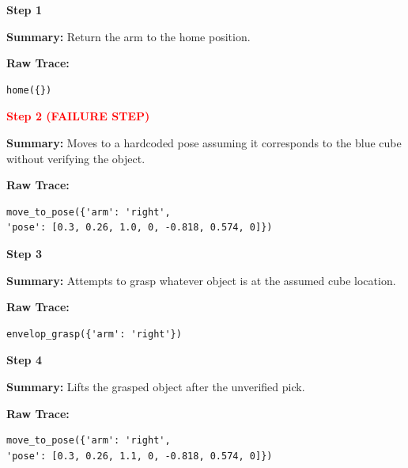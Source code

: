 \documentclass[11pt]{article}
\begin{document}


\begin{tcolorbox}[
breakable,
colback=customwhite,
colframe=customgreen,
title=False Assumption,
fontupper=\fontfamily{pcr}\selectfont\scriptsize
]

\textbf{Step 1}

\textbf{Summary:}  
Return the arm to the home position.

\textbf{Raw Trace:}
\begin{verbatim}
home({})
\end{verbatim}

\medskip
\textbf{\textcolor{red}{Step 2 (FAILURE STEP)}}

\textbf{Summary:}  
Moves to a hardcoded pose assuming it corresponds to the blue cube without verifying the object.

\textbf{Raw Trace:}
\begin{verbatim}
move_to_pose({'arm': 'right',
'pose': [0.3, 0.26, 1.0, 0, -0.818, 0.574, 0]})
\end{verbatim}

\medskip
\textbf{Step 3}

\textbf{Summary:}  
Attempts to grasp whatever object is at the assumed cube location.

\textbf{Raw Trace:}
\begin{verbatim}
envelop_grasp({'arm': 'right'})
\end{verbatim}

\medskip
\textbf{Step 4}

\textbf{Summary:}  
Lifts the grasped object after the unverified pick.

\textbf{Raw Trace:}
\begin{verbatim}
move_to_pose({'arm': 'right',
'pose': [0.3, 0.26, 1.1, 0, -0.818, 0.574, 0]})
\end{verbatim}

\end{tcolorbox}

\clearpage
\end{document}
